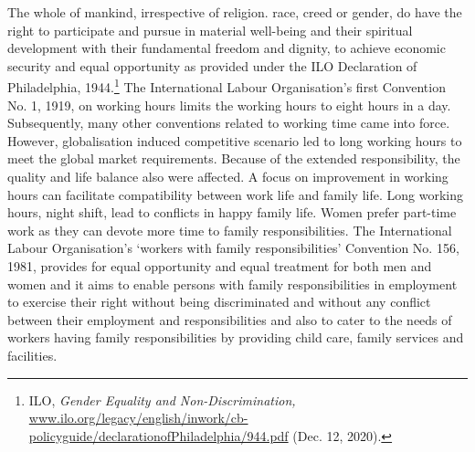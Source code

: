 \begin{multicols}{2}
\noi
The whole of mankind, irrespective of religion. race, creed or gender, do have the right to
participate and pursue in material well-being and their spiritual development with their
fundamental freedom and dignity, to achieve economic security and equal opportunity as
provided under the ILO Declaration of Philadelphia, 1944.\footnote{ILO, \textit{Gender Equality and Non-Discrimination,} \url{www.ilo.org/legacy/english/inwork/cb-policyguide/declarationofPhiladelphia/944.pdf} (Dec. 12, 2020).} The International Labour
Organisation’s first Convention No. 1, 1919, on working hours limits the working hours to
eight hours in a day. Subsequently, many other conventions related to working time came
into force. However, globalisation induced competitive scenario led to long working hours to
meet the global market requirements. Because of the extended responsibility, the quality and
life balance also were affected. A focus on improvement in working hours can facilitate
compatibility between work life and family life. Long working hours, night shift, lead to
conflicts in happy family life. Women prefer part-time work as they can devote more time to
family responsibilities. The International Labour Organisation’s ‘workers with family
responsibilities’ Convention No. 156, 1981, provides for equal opportunity and equal
treatment for both men and women and it aims to enable persons with family responsibilities
in employment to exercise their right without being discriminated and without any conflict 
between their employment and responsibilities and also to cater to the needs of workers
having family responsibilities by providing child care, family services and facilities.


\end{multicols}
